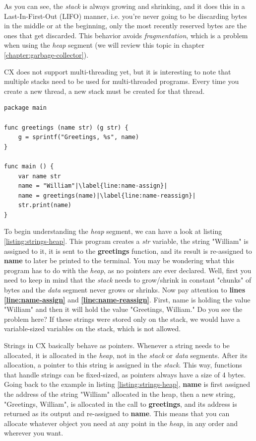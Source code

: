\documentclass[11pt,fleqn,openany]{book} %
\begin{document}
As you can see, the \emph{stack} is always growing and shrinking, and it does this in a Last-In-First-Out (LIFO) manner, i.e. you're never going to be discarding bytes in the middle or at the beginning, only the most recently reserved bytes are the ones that get discarded. This behavior avoids \emph{fragmentation}, which is a problem when using the \emph{heap} segment (we will review this topic in chapter \ref{chapter:garbage-collector}).

CX does not support multi-threading yet, but it is interesting to note that multiple stacks need to be used for multi-threaded programs. Every time you create a new thread, a new stack must be created for that thread.

\begin{lstlisting}[caption={Example of heap usage for strings},captionpos=b,label={listing:strings-heap}]
package main

func greetings (name str) (g str) {
	g = sprintf("Greetings, %s", name)
}

func main () {
	var name str
	name = "William"|\label{line:name-assign}|
	name = greetings(name)|\label{line:name-reassign}|
	str.print(name)
}
\end{lstlisting}

To begin understanding the \emph{heap} segment, we can have a look at listing \ref{listing:strings-heap}. This program creates a \emph{str} variable, the string "William" is assigned to it, it is sent to the \textbf{greetings} function, and its result is re-assigned to \textbf{name} to later be printed to the terminal. You may be wondering what this program has to do with the \emph{heap}, as no pointers are ever declared. Well, first you need to keep in mind that the \emph{stack} needs to grow/shrink in constant "chunks" of bytes and the \emph{data} segment never grows or shrinks. Now pay attention to \textbf{lines \ref{line:name-assign}} and \textbf{\ref{line:name-reassign}}. First, name is holding the value "William" and then it will hold the value "Greetings, William." Do you see the problem here? If these strings were stored only on the stack, we would have a variable-sized variables on the stack, which is not allowed.

Strings in CX basically behave as pointers. Whenever a string needs to be allocated, it is allocated in the \emph{heap}, not in the \emph{stack} or \emph{data} segments. After its allocation, a pointer to this string is assigned in the \emph{stack}. This way, functions that handle strings can be fixed-sized, as pointers always have a size of 4 bytes. Going back to the example in listing \ref{listing:strings-heap}, \textbf{name} is first assigned the address of the string "William" allocated in the heap, then a new string, "Greetings, William", is allocated in the call to \textbf{greetings}, and its address is returned as its output and re-assigned to \textbf{name}. This means that you can allocate whatever object you need at any point in the \emph{heap}, in any order and wherever you want.
\end{document}
